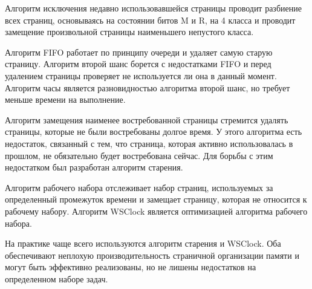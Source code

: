 Алгоритм исключения недавно использовавшейся страницы проводит
разбиение всех страниц, основываясь на состоянии битов M и R, на 4 класса и
проводит замещение произвольной страницы наименьшего непустого класса.

Алгоритм FIFO работает по принципу очереди и удаляет самую старую страницу. Алгоритм второй шанс борется с недостатками FIFO и перед удалением страницы проверяет не используется ли она в данный момент. Алгоритм
часы является разновидностью алгоритма второй шанс, но требует меньше времени на выполнение.

Алгоритм замещения наименее востребованной страницы стремится удалять страницы, которые не были востребованы долгое время. У этого
алгоритма есть недостаток, связанный с тем, что страница, которая активно
использовалась в прошлом, не обязательно будет востребована сейчас. Для
борьбы с этим недостатком был разработан алгоритм старения.

Алгоритм рабочего набора отслеживает набор страниц, используемых за определенный промежуток времени и замещает страницу, которая не относится
к рабочему набору. Алгоритм WSClock является оптимизацией алгоритма рабочего набора.

На практике чаще всего используются алгоритм старения и WSClock.
Оба обеспечивают неплохую производительность страничной организации
памяти и могут быть эффективно реализованы, но не лишены недостатков на определенном наборе задач.

